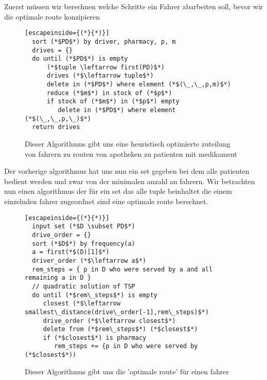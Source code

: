\documentclass[a4]{article}
\begin{document}
Zuerst müssen wir berechnen welche Schritte ein Fahrer abarbeiten soll, bevor wir die optimale route konzipieren

\begin{figure}[h!]
\begin{lstlisting}[escapeinside={(*}{*)}]
  sort (*$PD$*) by driver, pharmacy, p, m
  drives = {}
  do until (*$PD$*) is empty
      (*$tuple \leftarrow first(PD)$*)
      drives (*$\leftarrow tuple$*)
      delete in (*$PD$*) where element (*$(\_,\_,p,m)$*)
      reduce (*$m$*) in stock of (*$p$*)
      if stock of (*$m$*) in (*$p$*) empty
         delete in (*$PD$*) where element (*$(\_,\_,p,\_)$*)
  return drives
\end{lstlisting}
\caption{Dieser Algorithmus gibt uns eine heuristisch optimierte zuteilung von fahrern zu routen von apotheken zu patienten mit medikament}
\end{figure}

Der vorherige algorithmus hat uns nun ein set gegeben bei dem alle patienten bedient werden und zwar von der minimalen anzahl an fahrern. Wir betrachten nun einen algorithmus der für ein set das alle tuple beinhaltet die einem einzelnden fahrer zugeordnet sind eine optimale route berechnet.

\begin{figure}[h]
\begin{lstlisting}[escapeinside={(*}{*)}]
  input set (*$D \subset PD$*)
  drive_order = {}
  sort (*$D$*) by frequency(a)
  a = first(*$(D)[1]$*)
  driver_order (*$\leftarrow a$*)
  rem_steps = { p in D who were served by a and all remaining a in D }
  // quadratic solution of TSP
  do until (*$rem\_steps$*) is empty
     closest (*$\leftarrow smallest\_distance(drive\_order[-1],rem\_steps)$*)
     drive_order (*$\leftarrow closest$*)
     delete from (*$rem\_steps$*) (*$closest$*)
     if (*$closest$*) is pharmacy
        rem_steps += {p in D who were served by (*$closest$*))
\end{lstlisting}
\caption{Dieser Algorithmus gibt uns die 'optimale route' für einen fahrer}
\end{figure}
\end{document}
